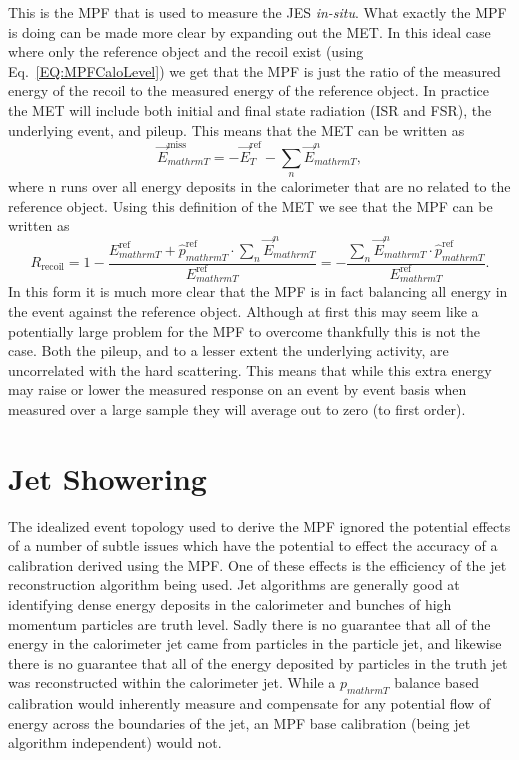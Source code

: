 This is the MPF that is used to measure the JES \textit{in-situ}.  
What exactly the MPF is doing can be made more clear by expanding out the MET.  
In this ideal case where only the reference object and the recoil exist (using Eq.~\ref{EQ:MPFCaloLevel}) we get that the MPF is just the ratio of the measured energy of the recoil to the measured energy of the reference object.  
In practice the MET will include both initial and final state radiation (ISR and FSR), the underlying event, and pileup.  
This means that the MET can be written as 
\begin{equation}
  \vec{E}_{mathrm T}^{\mathrm{miss}} = -\vec{E}_{T}^{\mathrm{ref}}-\sum_{n}\vec{E}_{mathrm T}^{n},
\end{equation}
where n runs over all energy deposits in the calorimeter that are no related to the reference object.  
Using this definition of the MET we see that the MPF can be written as 
\begin{equation}
  R_{\mathrm{recoil}}=1-\frac{E_{mathrm T}^{\mathrm{ref}}+\hat{p}_{mathrm T}^{\mathrm{ref}}\cdot\sum_{n}\vec{E}_{mathrm T}^{n}}{E_{mathrm T}^{\mathrm{ref}}}=-\frac{\sum_{n}\vec{E}_{mathrm T}^{n}\cdot\hat{p}_{mathrm T}^{\mathrm{ref}}}{E_{mathrm T}^{\mathrm{ref}}}.
\end{equation}
In this form it is much more clear that the MPF is in fact balancing all energy in the event against the reference object.  
Although at first this may seem like a potentially large problem for the MPF to overcome thankfully this is not the case.  
Both the pileup, and to a lesser extent the underlying activity, are uncorrelated with the hard scattering.  
This means that while this extra energy may raise or lower the measured response on an event by event basis when measured over a large sample they will average out to zero (to first order).  

\section{Jet Showering}

The idealized event topology used to derive the MPF ignored the potential effects of a number of subtle issues which have the potential to effect the accuracy of a calibration derived using the MPF.  
One of these effects is the efficiency of the jet reconstruction algorithm being used.  
Jet algorithms are generally good at identifying dense energy deposits in the calorimeter and bunches of high momentum particles are truth level.  
Sadly there is no guarantee that all of the energy in the calorimeter jet came from particles in the particle jet, and likewise there is no guarantee that all of the energy deposited by particles in the truth jet was reconstructed within the calorimeter jet.  
While a $p_{mathrm T}$ balance based calibration would inherently measure and compensate for any potential flow of energy across the boundaries of the jet, an MPF base calibration (being jet algorithm independent) would not.   

